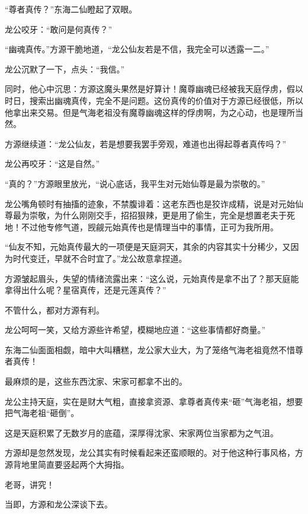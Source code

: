 
\begin{this_body}



“尊者真传？”东海二仙瞪起了双眼。

龙公咬牙：“敢问是何真传？”

“幽魂真传。”方源干脆地道，“龙公仙友若是不信，我完全可以透露一二。”

龙公沉默了一下，点头：“我信。”

同时，他心中沉思：方源这魔头果然是好算计！魔尊幽魂已经被我天庭俘虏，假以时日，搜索出幽魂真传，完全不是问题。这份真传的价值对于方源已经很低，所以他拿出来交易。但是气海老祖没有魔尊幽魂这样的俘虏啊，为之心动，也是理所当然。

方源继续道：“龙公仙友，若是想要我罢手旁观，难道也出得起尊者真传吗？”

龙公再咬牙：“这是自然。”

“真的？”方源眼里放光，“说心底话，我平生对元始仙尊是最为崇敬的。”

龙公嘴角顿时有抽搐的迹象，不禁腹诽着：这老东西也是狡诈成精，说是对元始仙尊最为崇敬，为什么刚刚交手，招招狠辣，更是用了偷生，完全是想置老夫于死地！不过他专修气道，觊觎元始真传也是情理当中的事情，正可为我所用。

“仙友不知，元始真传最大的一项便是天庭洞天，其余的内容其实十分稀少，又因为时代变迁，早就不合时宜了。”龙公故意拿捏道。

方源皱起眉头，失望的情绪流露出来：“这么说，元始真传是拿不出了？那天庭能拿得出什么呢？星宿真传，还是元莲真传？”

不管什么，都对方源有利。

龙公呵呵一笑，又给方源些许希望，模糊地应道：“这些事情都好商量。”

东海二仙面面相觑，暗中大叫糟糕，龙公家大业大，为了笼络气海老祖竟然不惜尊者真传！

最麻烦的是，这些东西沈家、宋家可都拿不出的。

龙公主持天庭，实在是财大气粗，直接拿资源、拿尊者真传来“砸”气海老祖，想要把气海老祖“砸倒”。

这是天庭积累了无数岁月的底蕴，深厚得沈家、宋家两位当家都为之气沮。

方源却是忽然发现，龙公其实有时候看起来还蛮顺眼的。对于他这种行事风格，方源背地里简直要竖起两个大拇指。

老哥，讲究！

当即，方源和龙公深谈下去。


\end{this_body}
